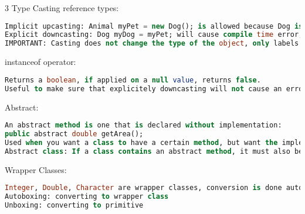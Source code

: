 \documentclass[10pt,landscape]{article}
\begin{document}
\begin{multicols}{3}
Type Casting reference types:
\begin{lstlisting}[language=SQL]
Implicit upcasting: Animal myPet = new Dog(); is allowed because Dog is a subclass of Animal. 
Explicit downcasting: Dog myDog = myPet; will cause compile time error, must do Dog myDog = (Dog) myPet; will cause a runtime error if myPet turned out to not be a Dog.
IMPORTANT: Casting does not change the type of the object, only labels it differently.
\end{lstlisting}
instanceof operator: 
\begin{lstlisting}[language=SQL]
Returns a boolean, if applied on a null value, returns false. 
Useful to make sure that explicitely downcasting will not cause an error e.g. when overriding equals. 
\end{lstlisting}
Abstract: 
\begin{lstlisting}[language=SQL]
An abstract method is one that is declared without implementation: 
public abstract double getArea();
Used when you want a class to have a certain method, but want the implementation to be specified by the subclass (e.g. area of triangle vs circle).  
Abstract class: If a class contains an abstract method, it must also be declared abstract, converse is false. It can declare both abstract and concrete methods. A subclass derived from an abstract class must either implement all the abstract methods or be abstract itself. Can contain a constructor, cannot be instantiated.
\end{lstlisting}
Wrapper Classes:
\begin{lstlisting}[language=SQL]
Integer, Double, Character are wrapper classes, conversion is done automatically, these classes enable us to call methods on primitive types such as Integer.MAX_VALUE. 
Autoboxing: converting to wrapper class
Unboxing: converting to primitive
\end{lstlisting}

\end{multicols}
\end{document}

